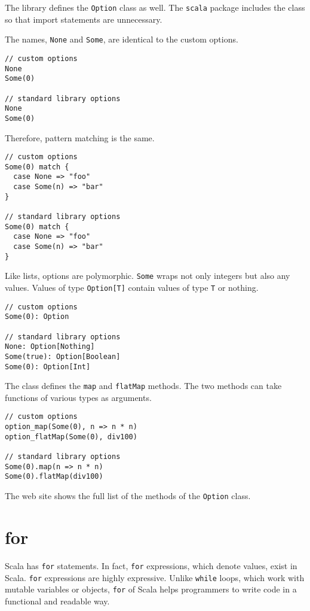 The library defines the \verb!Option! class as well. The \verb!scala! package
includes the class so that import statements are unnecessary.

The names, \verb!None! and \verb!Some!, are identical to the custom options.

\begin{verbatim}
// custom options
None
Some(0)

// standard library options
None
Some(0)
\end{verbatim}

Therefore, pattern matching is the same.

\begin{verbatim}
// custom options
Some(0) match {
  case None => "foo"
  case Some(n) => "bar"
}

// standard library options
Some(0) match {
  case None => "foo"
  case Some(n) => "bar"
}
\end{verbatim}

Like lists, options are polymorphic. \verb!Some! wraps not only integers but also
any values. Values of type \verb!Option[T]! contain values of type \verb!T! or
nothing.

\begin{verbatim}
// custom options
Some(0): Option

// standard library options
None: Option[Nothing]
Some(true): Option[Boolean]
Some(0): Option[Int]
\end{verbatim}

The class defines the \verb!map! and \verb!flatMap! methods. The two methods can
take functions of various types as arguments.

\begin{verbatim}
// custom options
option_map(Some(0), n => n * n)
option_flatMap(Some(0), div100)

// standard library options
Some(0).map(n => n * n)
Some(0).flatMap(div100)
\end{verbatim}

The web site shows
the full list of the methods of the \verb!Option! class.

\section{for}

Scala has \verb!for! statements. In fact, \verb!for! expressions, which denote
values, exist in Scala. \verb!for! expressions are highly expressive. Unlike
\verb!while! loops, which work with mutable variables or objects, \verb!for! of
Scala helps programmers to write code in a functional and readable way.

